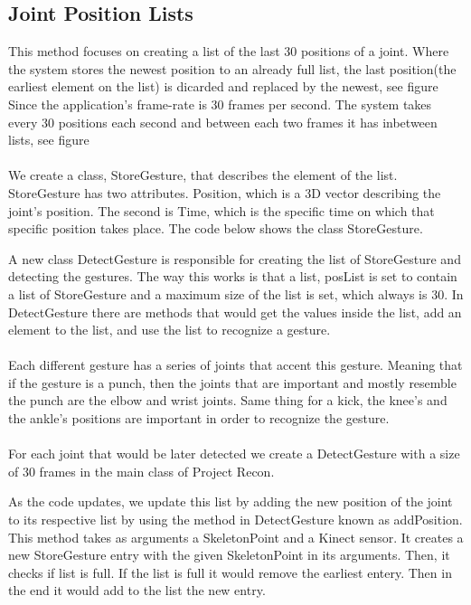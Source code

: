 \subsection{Joint Position Lists}
This method focuses on creating a list of the last 30 positions of a joint. Where the system stores the newest position to an already full list, the last position(the earliest element on the list) is dicarded and replaced by the newest, see figure %
Since the application's frame-rate is 30 frames per second. The system takes every 30 positions each second and between each two frames it has inbetween lists, see figure  %
\\
\\
We create a class, StoreGesture, that describes the element of the list. StoreGesture has two attributes. Position, which is a 3D vector describing the joint's position. The second is Time, which is the specific time on which that specific position takes place. The code below shows the class StoreGesture.



A new class  DetectGesture is responsible for creating the list of StoreGesture and detecting the gestures. The way this works is that a list, posList is set to contain a list of StoreGesture and a maximum size of the list is set, which always is 30. In DetectGesture there are methods that would get the values inside the list, add an element to the list, and use the list to recognize a gesture.
\\
\\
Each different gesture has a series of joints that accent this gesture. Meaning that if the gesture is a punch, then the joints that are important and mostly resemble the punch are the elbow and wrist joints. Same thing for a kick, the knee's and the ankle's positions are important in order to recognize the gesture.
\\
\\
For each joint that would be later detected we create a DetectGesture with a size of 30 frames in the main class of Project Recon.



As the code updates, we update this list by adding the new position of the joint to its respective list by using the method in DetectGesture known as addPosition. This method takes as arguments a SkeletonPoint and a Kinect sensor. It creates a new StoreGesture entry with the given SkeletonPoint in its arguments. Then, it checks if list is full. If the list is full it would remove the earliest entery. Then in the end it would add to the list the new entry.

